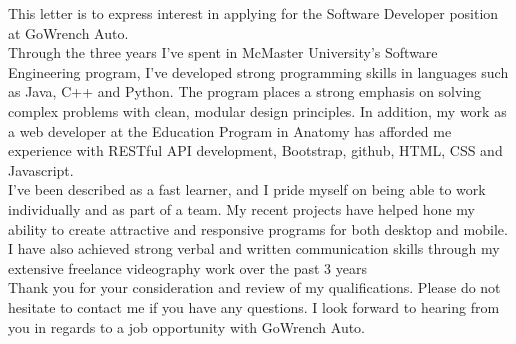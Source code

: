 \documentclass[11pt, a4paper]{awesome-cv} %
\begin{document}
\makecvheader %

\makelettertitle %


\begin{cvletter}


This letter is to express interest in applying for the Software Developer 
position at GoWrench Auto.\\

Through the three years I’ve spent in McMaster University’s Software 
Engineering program, I’ve developed strong programming skills in languages such 
as Java, C++ and Python. The program places a strong emphasis on solving 
complex problems with clean, modular design principles. In addition, my work as 
a web developer at the Education Program in Anatomy has afforded me experience 
with RESTful API development, Bootstrap, github, HTML, CSS and Javascript.\\

I’ve been described as a fast learner, and I pride myself on being able to work 
individually and as part of a team. My recent projects have helped hone my 
ability to create attractive and responsive programs for both desktop and 
mobile. I have also achieved strong verbal and written communication skills 
through my extensive freelance videography work over the past 3 years\\

Thank you for your consideration and review of my qualifications. Please do not 
hesitate to contact me if you have any questions. I look forward to hearing 
from you in regards to a job opportunity with GoWrench Auto.


\end{cvletter}


\makeletterclosing %
\end{document}
